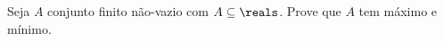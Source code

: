 \begin{exercise}
%
%
%
Seja $A$ conjunto finito não-vazio com $A \subseteq \reals$.
Prove que $A$ tem máximo e mínimo.
\end{exercise}
